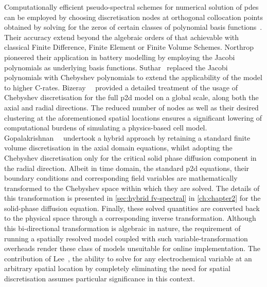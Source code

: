 Computationally    efficient     pseudo-spectral    schemes     for    numerical
solution   of   \gls{pde}s   can be employed    by   choosing   discretisation
nodes    at    orthogonal    collocation     points    obtained    by    solving
for     the    zeros     of    certain     classes    of     polynomial    basis
functions~\cite{Ferguson1971,Trefethen2000,Boyd2001,Shizgal2015,Dutykh2016}.
Their accuracy extend beyond  the  algebraic  orders of that achievable with
classical  Finite  Difference,  Finite Element  or Finite Volume Schemes.
Northrop~\etal{}~\cite{Northrop2011} pioneered their application in battery
modelling by employing the Jacobi polynomials as underlying basis functions.
Suthar\etal{}~\cite{Suthar2014} replaced the Jacobi polynomials with Chebyshev
polynomials to extend the applicability of the model to higher C-rates.
Bizeray~\etal{}~\cite{Bizeray2015}    provided   a detailed treatment of the
usage of Chebyshev discretisation  for   the  full   \gls{p2d} model   on  a
global  scale,  \ie{}  along  both   the  axial  and  radial directions.  The
reduced  number  of  nodes  as  well as  their  desired clustering  at  the
aforementioned  spatial  locations  ensures  a  significant lowering  of
computational  burdens of  simulating a  physics-based cell  model.
Gopalakrishnan~\etal{}~\cite{Gopalakrishnan2018} undertook a  hybrid approach by
retaining a standard finite volume discretisation in the axial domain equations,
whilst adopting the  Chebyshev discretisation only for the  critical solid phase
diffusion component in the radial direction. Albeit in time domain, the standard
\gls{p2d} equations, their boundary conditions and corresponding field variables
are  mathematically transformed  to the  Chebyshev space  within which  they are
solved.  The details  of this  transformation is  presented in  \cref{sec:hybrid
fv-spectral} in  \cref{ch:chapter2} for  the solid-phase diffusion equation.
Finally,   these  solved  quantities   are  converted  back   to  the physical
space through  a corresponding  inverse transformation.  Although this
bi-directional transformation is algebraic in nature, the requirement of running
a spatially resolved model coupled with  such variable-transformation overheads
render these class  of models unsuitable for  online implementation. The
contribution of Lee~\etal{}, \ie{} the  ability to solve for any electrochemical
variable at an arbitrary spatial location by completely eliminating the need for
spatial discretisation assumes particular significance in this  context.


